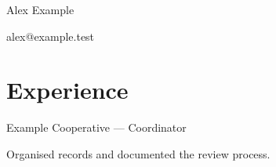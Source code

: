\documentclass{article}
\newcommand{\cvheading}[1]{\section*{#1}}
\begin{document}
{\Large Alex Example}\par
alex@example.test\par
\cvheading{Experience}
Example Cooperative --- Coordinator\par
Organised records and documented the review process.\par
\end{document}
